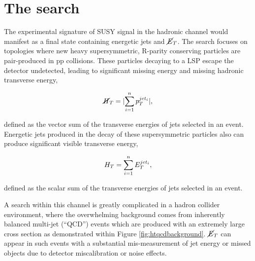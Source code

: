\section{The \alphat search}
\label{sec:alphatintroduction}

The experimental signature of \ac{SUSY} signal in the hadronic channel would manifest as a final state containing energetic jets and $\cancel{E}_{T}$. The search focuses on topologies where new heavy supersymmetric, R-parity conserving particles are pair-produced in pp collisions. These particles decaying to a \ac{LSP} escape the detector undetected, leading to significant missing energy and missing hadronic transverse energy,

\begin{equation}
\cancel{H}_{T} =  \lvert \sum_{i=1}^{n} p_{T}^{jet_{i}} \rvert,
\end{equation}

defined as the vector sum of the transverse energies of jets selected in an event. Energetic jets produced in the decay of these supersymmetric particles also 
can produce significant visible transverse energy, 

\begin{equation}
H_{T} = \sum_{i=1}^{n} E_{T}^{jet_{i}},
\end{equation}

defined as the scalar sum of the transverse energies of jets selected in an event.

A search within this channel is greatly complicated in a hadron collider environment, where the overwhelming background comes from inherently balanced multi-jet (``QCD'') events which are produced with an extremely large cross section as demonstrated within Figure \ref{fig:htqcdbackground}. $\cancel{E}_{T}$ can appear in such events with a substantial mis-measurement of jet energy or missed objects due to detector miscalibration or noise effects. 

